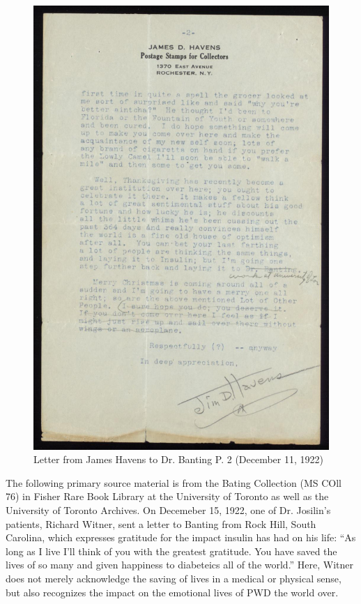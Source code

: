 \documentclass[12pt]{article}
\begin{document}
\begin{figure}
\centering
  \includegraphics [width=5in]{thankshavep2}
  \caption{Letter from James Havens to Dr. Banting P. 2 (December 11, 1922)}
  \label{fig: Thanksgiving Letter P. 2}
\end{figure}

The following primary source material is from the Bating Collection (MS COll 76) in Fisher Rare Book Library at the University of Toronto as well as the University of Toronto Archives. 
On Decemeber 15, 1922, one of Dr. Josilin's patients, Richard Witner, sent a letter to Banting from Rock Hill, South Carolina, which expresses gratitude for the impact insulin has had on his life:
``As long as I live I'll think of you with the greatest gratitude. You have saved the lives of so many and given happiness to diabeteics all of the world.''
Here, Witner does not merely acknowledge the saving of lives in a medical or physical sense, but also recognizes the impact on the emotional lives of PWD the world over. 
\end{document}
